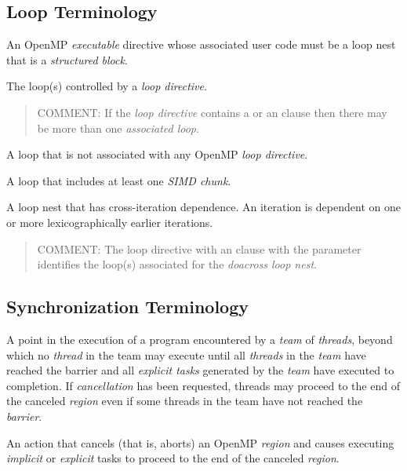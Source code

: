 \subsection{Loop Terminology}
\glossarydefstart
An OpenMP \emph{executable} directive whose associated user code must be a loop nest that is a \emph{structured block}.
\glossarydefend

\glossarydefstart
The loop(s) controlled by a \emph{loop directive}.
\begin{quote}
COMMENT: If the \emph{loop directive} contains a  or an \code{)} clause then there may be more than one \emph{associated loop}.
\end{quote}
\glossarydefend

\glossarydefstart
A loop that is not associated with any OpenMP \emph{loop directive}.
\glossarydefend

\glossarydefstart
A loop that includes at least one \emph{SIMD chunk}.
\glossarydefend

\glossarydefstart
A loop nest that has cross-iteration dependence. An iteration is dependent on one or more lexicographically earlier iterations.
\begin{quote}
COMMENT: The loop directive with an  clause with the parameter identifies the loop(s) associated for the \emph{doacross loop nest}.
\end{quote}
\glossarydefend

%
%
\subsection{Synchronization Terminology}
\glossarydefstart
A point in the execution of a program encountered by a \emph{team} of \emph{threads}, beyond 
which no \emph{thread} in the team may execute until all \emph{threads} in the \emph{team} have 
reached the barrier and all \emph{explicit tasks} generated by the \emph{team} have executed to 
completion. If \emph{cancellation} has been requested, threads may proceed to the end of 
the canceled \emph{region} even if some threads in the team have not reached the \emph{barrier}.
\glossarydefend

\glossarydefstart
An action that cancels (that is, aborts) an OpenMP \emph{region} and causes executing 
\emph{implicit} or \emph{explicit} tasks to proceed to the end of the canceled \emph{region}. 
\glossarydefend

